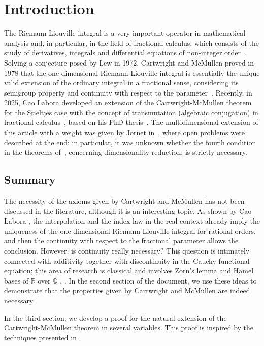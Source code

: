 \documentclass[12pt,reqno]{amsart}
\theoremstyle{plain}
\numberwithin{equation}{section} %
\begin{document}
\tableofcontents


\section{Introduction}

The Riemann-Liouville integral is a very important operator in mathematical analysis and, in particular, in the field of fractional calculus, which consists of the study of derivatives, integrals and differential equations of non-integer order~\cite{diethelm}. Solving a conjecture posed by Lew in 1972, Cartwright and McMullen proved in 1978 that the one-dimensional Riemann-Liouville integral is essentially the unique valid extension of the ordinary integral in a fractional sense, considering its semigroup property and continuity with respect to the parameter~\cite{cart}. Recently, in 2025, Cao Labora developed an extension of the Cartwright-McMullen theorem for the Stieltjes case with the concept of transmutation (algebraic conjugation) in fractional calculus~\cite{cao_jie}, based on his PhD thesis~\cite{tese}. The multidimensional extension of this article with a weight was given by Jornet in~\cite{meu}, where open problems were described at the end: in particular, it was unknown whether the fourth condition in the theorems of~\cite{meu}, concerning dimensionality reduction, is strictly necessary.

\subsection{Summary}

The necessity of the axioms given by Cartwright and McMullen has not been discussed in the literature, although it is an interesting topic. As shown by Cao Labora \cite{cao_jie,tese}, the interpolation and the index law in the real context already imply the uniqueness of the one-dimensional Riemann-Liouville integral for rational orders, and then the continuity with respect to the fractional parameter allows the conclusion. However, is continuity really necessary? This question is intimately connected with additivity together with discontinuity in the Cauchy functional equation; this area of research is classical and involves Zorn's lemma and Hamel bases of $\mathbb{R}$ over $\mathbb{Q}$ \cite[Chapter~3]{saaty}, \cite{aczel}. In the second section of the document, we use these ideas to demonstrate that the properties given by Cartwright and McMullen are indeed necessary.

In the third section, we develop a proof for the natural extension of the Cartwright-McMullen theorem in several variables. This proof is inspired by the techniques presented in \cite{cart}.
\end{document}
